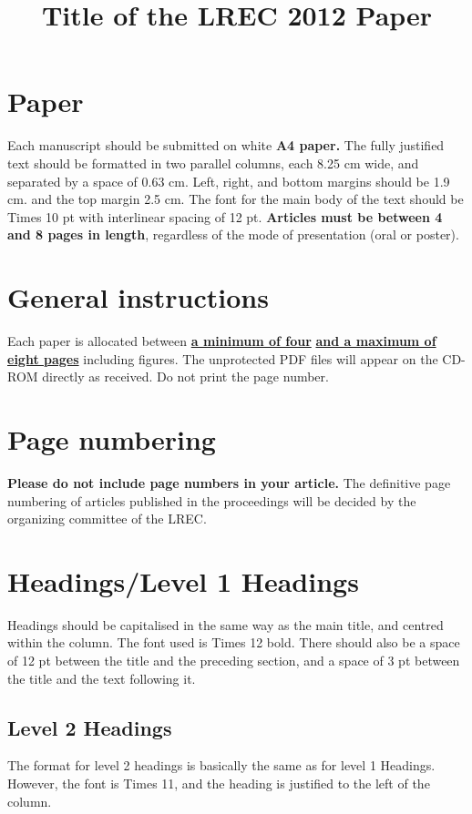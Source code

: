 \documentclass[10pt, a4paper]{article}
\title{Title of the LREC 2012 Paper}
\begin{document}
\maketitleabstract

\section{Paper}
Each manuscript should be submitted on white \textbf{A4 paper.} The fully justified text should be formatted in two parallel columns, each 8.25 cm wide, and separated by a space of 0.63 cm. Left, right, and bottom margins should be 1.9 cm. and the top margin 2.5 cm. The font for the main body of the text should be Times 10 pt with interlinear spacing of 12 pt.
\textbf{Articles must be between 4 and 8 pages in length}, regardless of the mode of presentation (oral or poster).

\section{General instructions}

Each paper is allocated between \underline{\textbf{a mi\-ni\-mum of four}} \textbf{\underline{and a maximum of eight pages} } including figures. \newline The unprotected PDF files will appear on the CD-ROM directly as received. Do not print the page number.

\section{Page numbering}

\textbf{Please do not include page numbers in your article.} The definitive page numbering of articles published in the proceedings will be decided by the organizing committee of the LREC.

\section{Headings/Level 1 Headings}

Headings should be capitalised in the same way as the main title, and centred within the column. The font used is Times 12 bold. There should also be a space of 12 pt between the title and the preceding section, and a space of 3 pt between the title and the text following it.

\subsection{Level 2 Headings}

The format for level 2 headings is basically the same as for level 1 Headings. However, the font is Times 11, and the heading is justified to the left of the column.
\end{document}
